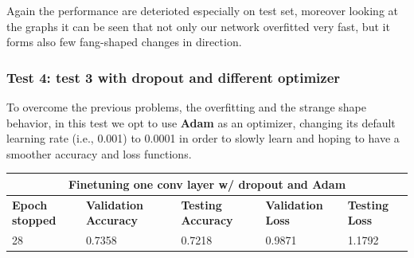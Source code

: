 Again the performance are deterioted especially on test set, moreover looking at the graphs it can be seen that not only our network overfitted very fast, but it forms also few fang-shaped changes in direction. 






\subsubsection{Test 4: test 3 with dropout and different optimizer}
To overcome the previous problems, the overfitting and the strange shape behavior, in this test we opt to use \textbf{Adam} as an optimizer, changing its default learning rate (i.e., 0.001) to 0.0001 in order to slowly learn and hoping to have a smoother accuracy and loss functions.

 
 \medskip

\begin{tabular}{ |p{2cm}|p{2cm}|p{2cm}|p{2cm}|p{2cm}|  }
\hline
\multicolumn{5}{|c|}{Finetuning one conv layer w/ dropout and Adam} \\
\hline
\textbf{Epoch stopped} & \textbf{Validation Accuracy} & \textbf{Testing Accuracy} & \textbf{Validation Loss} & \textbf{Testing Loss} \\
\hline
28 & 0.7358 & 0.7218 & 0.9871 & 1.1792\\
\hline
\end{tabular}

\medskip

